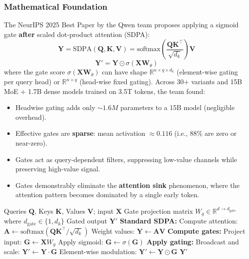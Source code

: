 \documentclass[11pt,a4paper]{article}
\begin{document}
\subsubsection{Mathematical Foundation}

The NeurIPS 2025 Best Paper by the Qwen team proposes applying a sigmoid gate \textbf{after} scaled dot-product attention (SDPA):
\[
\mathbf{Y} = \text{SDPA}(\mathbf{Q}, \mathbf{K}, \mathbf{V}) = \text{softmax}\left(\frac{\mathbf{Q}\mathbf{K}^\top}{\sqrt{d_k}}\right) \mathbf{V}
\]
\[
\mathbf{Y}' = \mathbf{Y} \odot \sigma\left(\mathbf{X} \mathbf{W}_\theta\right)
\]
where the gate score $\sigma(\mathbf{X} \mathbf{W}_\theta)$ can have shape $\mathbb{R}^{n \times q \times d_k}$ (element-wise gating per query head) or $\mathbb{R}^{n \times q}$ (head-wise fixed gating). Across 30+ variants and 15B MoE + 1.7B dense models trained on 3.5T tokens, the team found:

\begin{itemize}[leftmargin=*]
    \item Headwise gating adds only $\sim 1.6M$ parameters to a 15B model (negligible overhead).
    \item Effective gates are \textbf{sparse}: mean activation $\approx 0.116$ (i.e., 88\% are zero or near-zero).
    \item Gates act as query-dependent filters, suppressing low-value channels while preserving high-value signal.
    \item Gates demonstrably eliminate the \textbf{attention sink} phenomenon, where the attention pattern becomes dominated by a single early token.
\end{itemize}

\begin{algorithm}[H]
\caption{Gated Softmax Attention (Post-SDPA)}
\begin{algorithmic}[1]
\Require Queries $\mathbf{Q}$, Keys $\mathbf{K}$, Values $\mathbf{V}$; input $\mathbf{X}$
\Require Gate projection matrix $W_g \in \mathbb{R}^{d \to d_{\text{gate}}}$ where $d_{\text{gate}} \in \{1, d_k\}$
\Ensure Gated output $\mathbf{Y}'$
\State \textbf{Standard SDPA:}
\State Compute attention: $\mathbf{A} \gets \text{softmax}(\mathbf{Q}\mathbf{K}^\top / \sqrt{d_k})$ 
\State Weight values: $\mathbf{Y} \gets \mathbf{A} \mathbf{V}$
\State \textbf{Compute gates:}
\State Project input: $\mathbf{G} \gets \mathbf{X} W_g$  
\State Apply sigmoid: $\mathbf{G} \gets \sigma(\mathbf{G})$ 
\State \textbf{Apply gating:}
    \State Broadcast and scale: $\mathbf{Y}' \gets \mathbf{Y} \cdot \mathbf{G}$ 
\Else
    \State Element-wise modulation: $\mathbf{Y}' \gets \mathbf{Y} \odot \mathbf{G}$ 
\EndIf
\Return $\mathbf{Y}'$
\end{algorithmic}
\end{algorithm}
\end{document}
